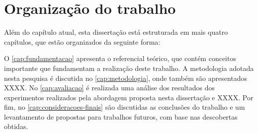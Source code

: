 \section{Organização do trabalho}
\label{sec:introducao-organizacao-trabalho}

Além do capítulo atual, esta dissertação está estruturada em mais quatro capítulos, que estão organizados da seguinte forma:

O \autoref{cap:fundamentacao} apresenta o referencial teórico, que contém conceitos importante que fundamentam a realização deste trabalho. 
A metodologia adotada nesta pesquisa é discutida no \autoref{cap:metodologia}, onde também são apresentados XXXX. 
No \autoref{cap:avaliacao} é realizada uma análise dos resultados dos experimentos realizados pela abordagem proposta nesta dissertação e XXXX. 
Por fim, no \autoref{cap:consideracoes-finais} são discutidas as conclusões do trabalho e um levantamento de propostas para trabalhos futuros, com base nas descobertas obtidas.
